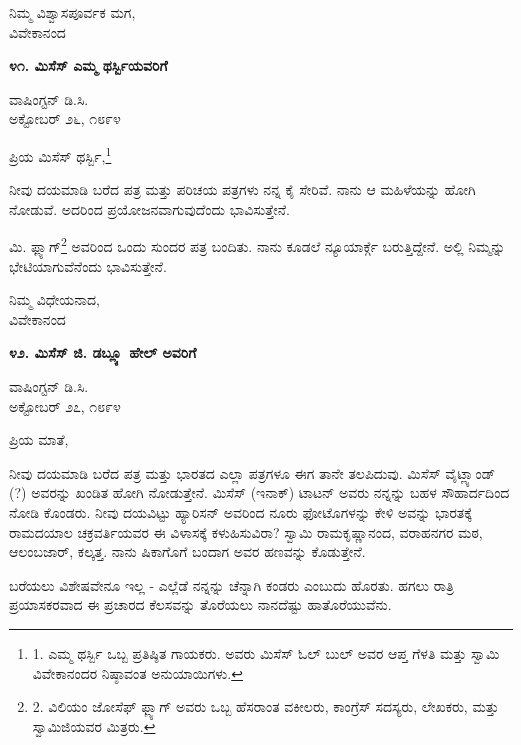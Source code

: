 \begin{flushright}
ನಿಮ್ಮ ವಿಶ್ವಾಸಪೂರ್ವಕ ಮಗ,\\ವಿವೇಕಾನಂದ
\end{flushright}

\begin{center}
\textbf{೪೧. ಮಿಸೆಸ್ ಎಮ್ಮ ಥರ್ಸ್ಬಿಯವರಿಗೆ}
\end{center}

\begin{flushright}
ವಾಷಿಂಗ್ಟನ್ ಡಿ.ಸಿ.\\ಅಕ್ಟೋಬರ್ ೨೬, ೧೮೯೪
\end{flushright}

ಪ್ರಿಯ ಮಿಸೆಸ್ ಥರ್ಸ್ಬಿ,\footnote{1. ಎಮ್ಮ ಥರ್ಸ್ಬಿ ಒಬ್ಬ ಪ್ರತಿಷ್ಠಿತ ಗಾಯಕರು. ಅವರು ಮಿಸೆಸ್ ಓಲ್ ಬುಲ್ ಅವರ ಆಪ್ತ ಗೆಳತಿ ಮತ್ತು ಸ್ವಾಮಿ ವಿವೇಕಾನಂದರ ನಿಷ್ಠಾವಂತ ಅನುಯಾಯಿಗಳು.}

ನೀವು ದಯಮಾಡಿ ಬರೆದ ಪತ್ರ ಮತ್ತು ಪರಿಚಯ ಪತ್ರಗಳು ನನ್ನ ಕೈ ಸೇರಿವೆ. ನಾನು ಆ ಮಹಿಳೆಯನ್ನು ಹೋಗಿ ನೋಡುವೆ. ಅದರಿಂದ ಪ್ರಯೋಜನವಾಗುವುದೆಂದು ಭಾವಿಸುತ್ತೇನೆ.

ಮಿ. ಫ್ಲ್ಯಾಗ್\footnote{2. ವಿಲಿಯಂ ಜೋಸೆಫ್ ಫ್ಲ್ಯಾಗ್ ಅವರು ಒಬ್ಬ ಹೆಸರಾಂತ ವಕೀಲರು, ಕಾಂಗ್ರೆಸ್ ಸದಸ್ಯರು, ಲೇಖಕರು, ಮತ್ತು ಸ್ವಾಮಿಜಿಯವರ ಮಿತ್ರರು.} ಅವರಿಂದ ಒಂದು ಸುಂದರ ಪತ್ರ ಬಂದಿತು. ನಾನು ಕೂಡಲೆ ನ್ಯೂಯಾರ್ಕ್ಗೆ ಬರುತ್ತಿದ್ದೇನೆ. ಅಲ್ಲಿ ನಿಮ್ಮನ್ನು ಭೇಟಿಯಾಗುವೆನೆಂದು ಭಾವಿಸುತ್ತೇನೆ.

\begin{flushright}
ನಿಮ್ಮ ವಿಧೇಯನಾದ,\\ವಿವೇಕಾನಂದ
\end{flushright}

\begin{center}
\textbf{೪೨. ಮಿಸೆಸ್ ಜಿ. ಡಬ್ಲ್ಯೂ ಹೇಲ್ ಅವರಿಗೆ}
\end{center}

\begin{flushright}
ವಾಷಿಂಗ್ಟನ್ ಡಿ.ಸಿ.\\ಅಕ್ಟೋಬರ್ ೨೭, ೧೮೯೪
\end{flushright}

ಪ್ರಿಯ ಮಾತೆ,

ನೀವು ದಯಮಾಡಿ ಬರೆದ ಪತ್ರ ಮತ್ತು ಭಾರತದ ಎಲ್ಲಾ ಪತ್ರಗಳೂ ಈಗ ತಾನೇ ತಲಪಿದುವು. ಮಿಸೆಸ್ ವೈಟ್ಲ್ಯಾಂಡ್ (?) ಅವರನ್ನು ಖಂಡಿತ ಹೋಗಿ ನೋಡುತ್ತೇನೆ. ಮಿಸೆಸ್ (ಇನಾಕ್) ಟಾಟನ್ ಅವರು ನನ್ನನ್ನು ಬಹಳ ಸೌಹಾರ್ದದಿಂದ ನೋಡಿ ಕೊಂಡರು. ನೀವು ದಯವಿಟ್ಟು ಹ್ಯಾರಿಸನ್ ಅವರಿಂದ ನೂರು ಫೋಟೊಗಳನ್ನು ಕೇಳಿ ಅವನ್ನು ಭಾರತಕ್ಕೆ ರಾಮದಯಾಲ ಚಕ್ರವರ್ತಿಯವರ ಈ ವಿಳಾಸಕ್ಕೆ ಕಳುಹಿಸುವಿರಾ?  ಸ್ವಾಮಿ ರಾಮಕೃಷ್ಣಾನಂದ, ವರಾಹನಗರ ಮಠ, ಆಲಂಬಜಾರ್, ಕಲ್ಕತ್ತ. ನಾನು ಷಿಕಾಗೊಗೆ ಬಂದಾಗ ಅವರ ಹಣವನ್ನು ಕೊಡುತ್ತೇನೆ.

ಬರೆಯಲು ವಿಶೇಷವೇನೂ ಇಲ್ಲ - ಎಲ್ಲೆಡೆ ನನ್ನನ್ನು ಚೆನ್ನಾಗಿ ಕಂಡರು ಎಂಬುದು ಹೊರತು. ಹಗಲು ರಾತ್ರಿ ಪ್ರಯಾಸಕರವಾದ ಈ ಪ್ರಚಾರದ ಕೆಲಸವನ್ನು ತೊರೆಯಲು ನಾನದೆಷ್ಟು ಹಾತೊರೆಯುವೆನು.

